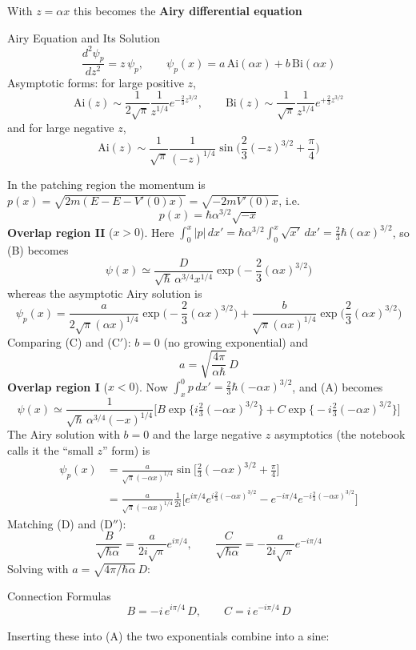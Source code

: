 \documentclass[11pt,a4paper]{article}
\begin{document}
With $z=\alpha x$ this becomes the \textbf{Airy differential equation}
\begin{thm}{Airy Equation and Its Solution}
\[
\frac{d^2\psi_p}{dz^2} = z\,\psi_p, \qquad \psi_p(x) = a\,\mathrm{Ai}(\alpha x) + b\,\mathrm{Bi}(\alpha x)
\]
Asymptotic forms: for large positive $z$,
\[
\mathrm{Ai}(z)\sim\frac1{2\sqrt\pi}\frac1{z^{1/4}}e^{-\frac23z^{3/2}}, \qquad \mathrm{Bi}(z)\sim\frac1{\sqrt\pi}\frac1{z^{1/4}}e^{+\frac23z^{3/2}}
\]
and for large negative $z$,
\[
\mathrm{Ai}(z)\sim\frac1{\sqrt\pi}\frac1{(-z)^{1/4}}\sin\Big(\frac23(-z)^{3/2}+\frac\pi4\Big)
\]
\end{thm}
In the patching region the momentum is $p(x)=\sqrt{2m(E-E-V'(0)x)} = \sqrt{-2mV'(0)x}$, i.e.
\[
p(x) = \hbar\alpha^{3/2}\sqrt{-x}
\]
\textbf{Overlap region II} ($x>0$). Here $\int_0^x|p|\,dx' = \hbar\alpha^{3/2}\int_0^x\sqrt{x'}\,dx' = \frac23\hbar(\alpha x)^{3/2}$, so (B) becomes
\[
\psi(x)\simeq\frac{D}{\sqrt\hbar\,\alpha^{3/4}x^{1/4}}\exp\Big(-\frac23(\alpha x)^{3/2}\Big) \tag{C}
\]
whereas the asymptotic Airy solution is
\[
\psi_p(x) = \frac{a}{2\sqrt\pi(\alpha x)^{1/4}}\exp\Big(-\frac23(\alpha x)^{3/2}\Big) + \frac{b}{\sqrt\pi(\alpha x)^{1/4}}\exp\Big(\frac23(\alpha x)^{3/2}\Big) \tag{C$'$}
\]
Comparing (C) and (C$'$): $b=0$ (no growing exponential) and
\[
\boxed{a = \sqrt{\frac{4\pi}{\alpha\hbar}}\,D}
\]
\textbf{Overlap region I} ($x<0$). Now $\int_x^0p\,dx' = \frac23\hbar(-\alpha x)^{3/2}$, and (A) becomes
\[
\psi(x)\simeq\frac{1}{\sqrt\hbar\,\alpha^{3/4}(-x)^{1/4}}\Big[B\exp\Big\{i\tfrac23(-\alpha x)^{3/2}\Big\} + C\exp\Big\{-i\tfrac23(-\alpha x)^{3/2}\Big\}\Big] \tag{D}
\]
The Airy solution with $b=0$ and the large negative $z$ asymptotics (the notebook calls it the ``small $z$'' form) is
\begin{align*}
\psi_p(x) &= \frac{a}{\sqrt\pi(-\alpha x)^{1/4}}\sin\Big[\frac23(-\alpha x)^{3/2}+\frac\pi4\Big]\\
&= \frac{a}{\sqrt\pi(-\alpha x)^{1/4}}\frac1{2i}\Big[e^{i\pi/4}e^{i\frac23(-\alpha x)^{3/2}} - e^{-i\pi/4}e^{-i\frac23(-\alpha x)^{3/2}}\Big] \tag{D$''$}
\end{align*}
Matching (D) and (D$''$):
\[
\frac{B}{\sqrt{\hbar\alpha}} = \frac a{2i\sqrt\pi}e^{i\pi/4}, \qquad \frac C{\sqrt{\hbar\alpha}} = -\frac a{2i\sqrt\pi}e^{-i\pi/4}
\]
Solving with $a=\sqrt{4\pi/\hbar\alpha}\,D$:
\begin{thm}{Connection Formulas}
\[
B = -i\,e^{i\pi/4}\,D, \qquad C = i\,e^{-i\pi/4}\,D
\]
\end{thm}
Inserting these into (A) the two exponentials combine into a sine:
\end{document}
